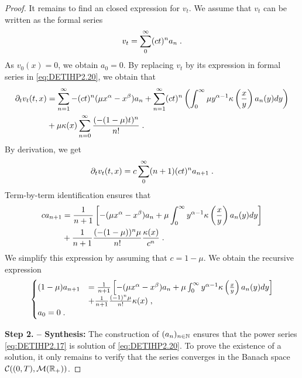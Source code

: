 \documentclass[11pt]{amsart}
\newcommand{\f}{\frac}
\begin{document}
\begin{proof}
It remains to find an closed expression for $v_t$. We assume that $v_t$ can be written as the formal series
\begin{align}
    v_t = \sum_0^\infty (c t)^n a_n
    \; .
    \label{eq:DETIHP2.17}
\end{align}
As $v_0(x) = 0$, we obtain $a_0 = 0$. 
By replacing $v_t$ by its expression in formal series in \eqref{eq:DETIHP2.20}, we obtain that
\begin{align*}
    \partial_t v_t(t,x)
    &=  
    \sum_{n = 1}^{\infty} -(c t)^n (\mu x^{\alpha} - x^\beta) a_n 
    + \sum_{n = 1}^{\infty} (c t)^n \left(  \int_0^\infty \mu y^{\alpha-1} \kappa \left( \f{x}{y}\right) a_n(y) dy\right) \\
    &+ \mu \kappa(x) \sum_{n = 0}^{\infty}\frac{(-(1-\mu)t)^n}{n!}\eqfinp
\end{align*}
By derivation, we get
\begin{align*}
   \partial_t v_t(t,x) = c \sum_0^\infty (n+1)(c t)^n a_{n+1}
    \; .
\end{align*}
Term-by-term identification ensures that
\begin{align*}
    c a_{n+1} 
    &= \frac{1}{n+1}\left[ -(\mu x^{\alpha} - x^\beta) a_n + \mu \int_0^\infty y^{\alpha-1} \kappa \left( \f{x}{y}\right) a_n(y) dy \right] \\
    &+ \frac{1}{n+1} \frac{(-(1-\mu))^n \mu }{n!}\frac{\kappa(x)}{c^n}
    \eqfinp
\end{align*}
We simplify this expression by assuming that $c = 1-\mu$. We obtain the recursive expression
\begin{align*}
    \begin{cases}
    (1-\mu) a_{n+1} 
    &= \frac{1}{n+1}\left[ -(\mu x^{\alpha} - x^\beta) a_n + \mu \int_0^\infty y^{\alpha-1} \kappa \left( \f{x}{y}\right) a_n(y) dy \right] \\
    &+ \frac{1}{n+1} \frac{(-1)^n \mu }{n!}\kappa(x) 
    \eqfinv \\
    a_0 = 0 \eqfinp
    \end{cases}
\end{align*}

\textbf{Step 2. -- Synthesis:} The construction of $(a_n)_{n\in\mathbb{N}}$ ensures that the power series \eqref{eq:DETIHP2.17} is solution of \eqref{eq:DETIHP2.20}. To prove the existence of a solution, it only remains to verify that the series converges in the Banach space $\mathcal{C}((0, T), \mathcal{M}(\mathbb{R}_+))$.


\end{proof}
\end{document}
